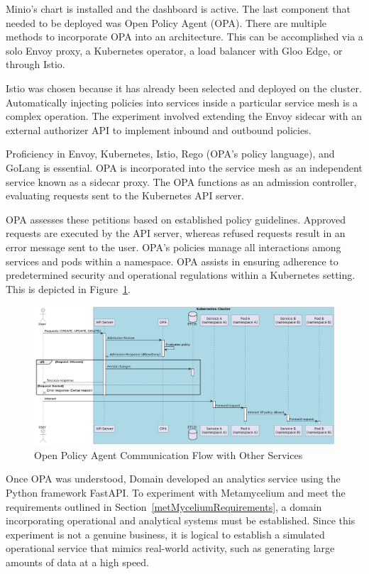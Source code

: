 \documentclass[journal]{IEEEtran}
\begin{document}
Minio's chart is installed and the dashboard is active. The last component that needed to be deployed was Open Policy Agent (OPA). There are multiple methods to incorporate OPA into an architecture. This can be accomplished via a solo Envoy proxy, a Kubernetes operator, a load balancer with Gloo Edge, or through Istio. 

Istio was chosen because it has already been selected and deployed on the cluster. Automatically injecting policies into services inside a particular service mesh is a complex operation. The experiment involved extending the Envoy sidecar with an external authorizer API to implement inbound and outbound policies. 

Proficiency in Envoy, Kubernetes, Istio, Rego (OPA's policy language), and GoLang is essential. OPA is incorporated into the service mesh as an independent service known as a sidecar proxy. The OPA functions as an admission controller, evaluating requests sent to the Kubernetes API server. 

OPA assesses these petitions based on established policy guidelines. Approved requests are executed by the API server, whereas refused requests result in an error message sent to the user. OPA's policies manage all interactions among services and pods within a namespace. OPA assists in ensuring adherence to predetermined security and operational regulations within a Kubernetes setting. This is depicted in Figure~\ref{OPAISTIO}.

\begin{figure}[h]
  \centering
  \includegraphics[width=\linewidth]{images/OPA-istio-flow.png}
  \caption{Open Policy Agent Communication Flow with Other Services}
  \label{OPAISTIO}
\end{figure}

Once OPA was understood, Domain developed an analytics service using the Python framework FastAPI. To experiment with Metamycelium and meet the requirements outlined in Section~\ref{metMyceliumRequirements}, a domain incorporating operational and analytical systems must be established. Since this experiment is not a genuine business, it is logical to establish a simulated operational service that mimics real-world activity, such as generating large amounts of data at a high speed. 
\end{document}
